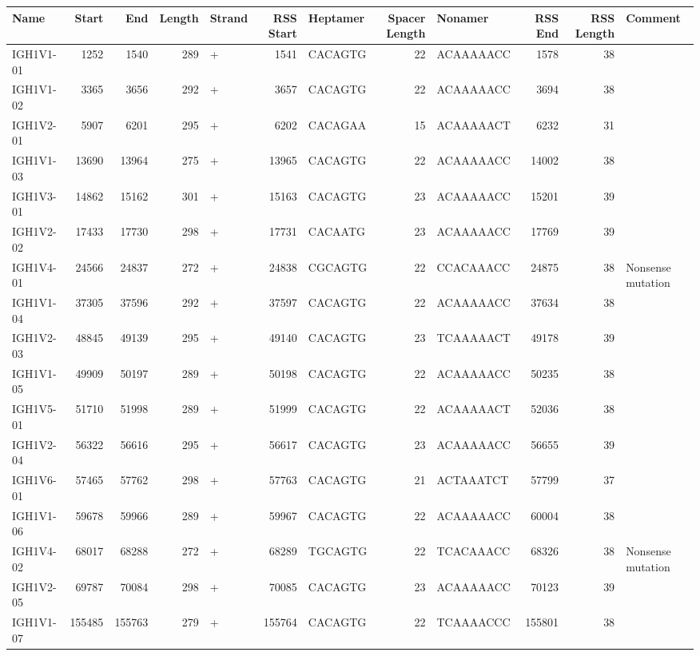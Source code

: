 \begin{tabular}{lrrrlrlrlrrl}
  \toprule Name & Start & End & Length & Strand & RSS Start & Heptamer & Spacer Length & Nonamer & RSS End & RSS Length & Comment \\ 
  \midrule IGH1V1-01 & 1252 & 1540 & 289 & + & 1541 & CACAGTG & 22 & ACAAAAACC & 1578 & 38 &  \\ 
  IGH1V1-02 & 3365 & 3656 & 292 & + & 3657 & CACAGTG & 22 & ACAAAAACC & 3694 & 38 &  \\ 
  IGH1V2-01 & 5907 & 6201 & 295 & + & 6202 & CACAGAA & 15 & ACAAAAACT & 6232 & 31 &  \\ 
  IGH1V1-03 & 13690 & 13964 & 275 & + & 13965 & CACAGTG & 22 & ACAAAAACC & 14002 & 38 &  \\ 
  IGH1V3-01 & 14862 & 15162 & 301 & + & 15163 & CACAGTG & 23 & ACAAAAACC & 15201 & 39 &  \\ 
  IGH1V2-02 & 17433 & 17730 & 298 & + & 17731 & CACAATG & 23 & ACAAAAACC & 17769 & 39 &  \\ 
  IGH1V4-01 & 24566 & 24837 & 272 & + & 24838 & CGCAGTG & 22 & CCACAAACC & 24875 & 38 & Nonsense mutation \\ 
  IGH1V1-04 & 37305 & 37596 & 292 & + & 37597 & CACAGTG & 22 & ACAAAAACC & 37634 & 38 &  \\ 
  IGH1V2-03 & 48845 & 49139 & 295 & + & 49140 & CACAGTG & 23 & TCAAAAACT & 49178 & 39 &  \\ 
  IGH1V1-05 & 49909 & 50197 & 289 & + & 50198 & CACAGTG & 22 & ACAAAAACC & 50235 & 38 &  \\ 
  IGH1V5-01 & 51710 & 51998 & 289 & + & 51999 & CACAGTG & 22 & ACAAAAACT & 52036 & 38 &  \\ 
  IGH1V2-04 & 56322 & 56616 & 295 & + & 56617 & CACAGTG & 23 & ACAAAAACC & 56655 & 39 &  \\ 
  IGH1V6-01 & 57465 & 57762 & 298 & + & 57763 & CACAGTG & 21 & ACTAAATCT & 57799 & 37 &  \\ 
  IGH1V1-06 & 59678 & 59966 & 289 & + & 59967 & CACAGTG & 22 & ACAAAAACC & 60004 & 38 &  \\ 
  IGH1V4-02 & 68017 & 68288 & 272 & + & 68289 & TGCAGTG & 22 & TCACAAACC & 68326 & 38 & Nonsense mutation \\ 
  IGH1V2-05 & 69787 & 70084 & 298 & + & 70085 & CACAGTG & 23 & ACAAAAACC & 70123 & 39 &  \\ 
  IGH1V1-07 & 155485 & 155763 & 279 & + & 155764 & CACAGTG & 22 & TCAAAACCC & 155801 & 38 &  \\ 

\end{tabular}
